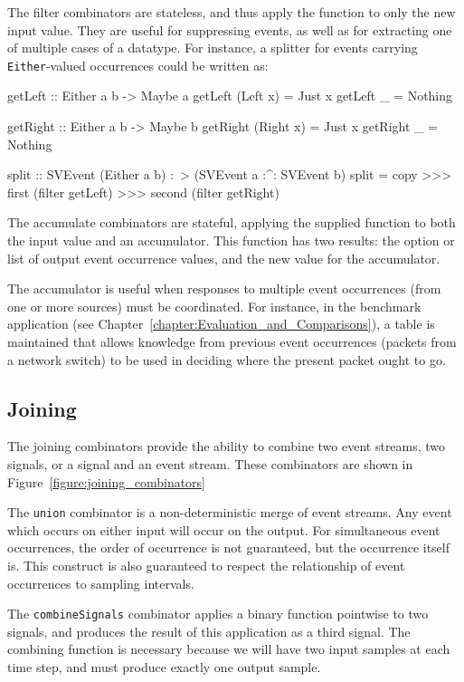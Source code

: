 The filter combinators are stateless, and thus apply the function to only the new
input value. They are useful for suppressing events, as well as for extracting one
of multiple cases of a datatype. For instance, a splitter for events carrying
{\tt Either}-valued occurrences could be written as:

\begin{code}
getLeft :: Either a b -> Maybe a
getLeft (Left x) = Just x
getLeft _ = Nothing

getRight :: Either a b -> Maybe b
getRight (Right x) = Just x
getRight _ = Nothing

split :: SVEvent (Either a b) :~> (SVEvent a :^: SVEvent b)
split = copy >>> first (filter getLeft) >>> second (filter getRight)
\end{code}

The accumulate combinators are stateful, applying the supplied function
to both the input value and an accumulator. This function has two results:
the option or list of output event occurrence values, and the new value
for the accumulator.

The accumulator is useful when responses to multiple event occurrences
(from one or more sources) must be coordinated. For instance, in the
benchmark application (see Chapter~\ref{chapter:Evaluation_and_Comparisons}),
a table is maintained that allows knowledge from previous event occurrences
(packets from a network switch) to be used in deciding where the present
packet ought to go.

\subsection{Joining}
\label{subsection:System_Design_and_Interface-Combinators-Joining}

The joining combinators provide the ability to combine two event
streams, two signals, or a signal and an event stream. These
combinators are shown in Figure~\ref{figure:joining_combinators}

The {\tt union} combinator is a non-deterministic merge of event
streams. Any event which occurs on either input will occur
on the output. For simultaneous event occurrences, the order of occurrence
is not guaranteed, but the occurrence itself is. This construct
is also guaranteed to respect the relationship of event occurrences to sampling
intervals.

The {\tt combineSignals} combinator applies a binary function pointwise to two
signals, and produces the result of this application as a third signal. The
combining function is necessary because we will have two input samples at each
time step, and must produce exactly one output sample.


